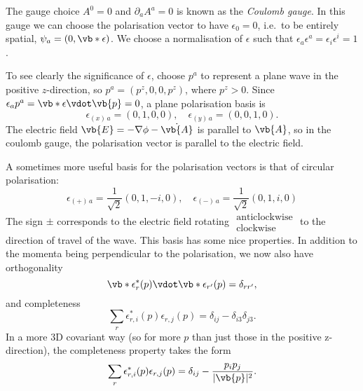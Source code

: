 \documentclass{jknotes} %
\begin{document}
The gauge choice \(A^0=0\) and \(\partial_a A^a=0\) is known as the \emph{Coulomb gauge}. In this gauge we can choose the polarisation vector to have \(\epsilon_0 = 0\), i.e.\ to be entirely spatial, \(\psi_a=(0,\vb*{\epsilon})\). We choose a normalisation of \(\epsilon\) such that \(\epsilon_a\epsilon^a = \epsilon_i\epsilon^i = 1\). 

To see clearly the significance of \(\epsilon\), choose \(p^a\) to represent a plane wave in the positive \(z\)-direction, so \(p^a = (p^z,0,0,p^z)\), where \(p^z>0\). Since \(\epsilon_a p^a = \vb*{\epsilon}\vdot\vb{p} = 0\), a plane polarisation basis is
\begin{equation}
    \epsilon_{(x)\,a} = (0,1,0,0),\quad \epsilon_{(y)\,a} = (0,0,1,0).
\end{equation}
The electric field \(\vb{E}=-\nabla\phi-\dot{\vb{A}}\) is parallel to \(\vb{A}\), so in the coulomb gauge, the polarisation vector is parallel to the electric field.

A sometimes more useful basis for the polarisation vectors is that of circular polarisation:
\begin{equation}
    \epsilon_{(+)\,a} = \frac{1}{\sqrt{2}} (0,1,-i,0),\quad
    \epsilon_{(-)\,a} = \frac{1}{\sqrt{2}} (0,1,i,0)
\end{equation}
The sign \(\pm\) corresponds to the electric field rotating \(
\begin{matrix}
    \text{anticlockwise} \\ \text{clockwise}
\end{matrix}\) to the direction of travel of the wave. This basis has some nice properties. In addition to the momenta being perpendicular to the polarisation, we now also have orthogonality
\begin{equation}
    \vb*{\epsilon}_r^*(p) \vdot \vb*{\epsilon}_{r'}(p) = \delta_{rr'},
\end{equation}
and completeness
\begin{equation}
    \sum_r \epsilon^*_{r,i}(p) \epsilon_{r,j}(p) = \delta_{ij} - \delta_{i3}\delta_{j3}.
\end{equation}
In a more 3D covariant way (so for more \(p\) than just those in the positive z-direction), the completeness property takes the form
\begin{equation}
    \sum_r \epsilon_{r,i}^*(p)\epsilon_{r,j}(p) = \delta_{ij} - \frac{p_ip_j}{|\vb{p}|^2}.
\end{equation}
\end{document}
